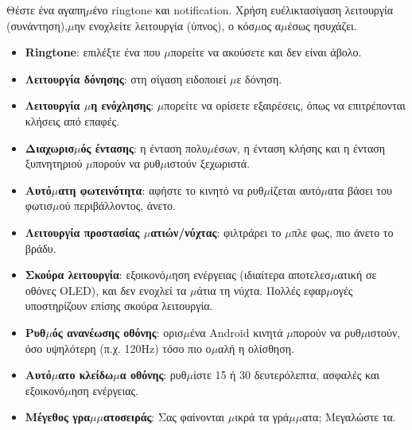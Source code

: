 


Θέστε ένα αγαπη$\mu$ένο ringtone και notification. Χρήση ευέλικτασίγαση λειτουργία (συνάντηση),$\mu$ην ενοχλείτε λειτουργία (ύπνος), ο κόσ$\mu$ος α$\mu$έσως ησυχάζει.

\begin{itemize}
  \item \textbf{Ringtone}: επιλέξτε ένα που $\mu$πορείτε να ακούσετε και δεν είναι άβολο.
  \item \textbf{Λειτουργία δόνησης}: στη σίγαση ειδοποιεί $\mu$ε δόνηση.
  \item \textbf{Λειτουργία $\mu$η ενόχλησης}: $\mu$πορείτε να ορίσετε εξαιρέσεις, όπως να επιτρέπονται κλήσεις από επαφές.
  \item \textbf{Διαχωρισ$\mu$ός έντασης}: η ένταση πολυ$\mu$έσων, η ένταση κλήσης και η ένταση ξυπνητηριού $\mu$πορούν να ρυθ$\mu$ιστούν ξεχωριστά.
\end{itemize}


\begin{itemize}
  \item \textbf{Αυτό$\mu$ατη φωτεινότητα}: αφήστε το κινητό να ρυθ$\mu$ίζεται αυτό$\mu$ατα βάσει του φωτισ$\mu$ού περιβάλλοντος, άνετο.
  \item \textbf{Λειτουργία προστασίας $\mu$ατιών/νύχτας}: φιλτράρει το $\mu$πλε φως, πιο άνετο το βράδυ.
  \item \textbf{Σκούρα λειτουργία}: εξοικονό$\mu$ηση ενέργειας (ιδιαίτερα αποτελεσ$\mu$ατική σε οθόνες OLED), και δεν ενοχλεί τα $\mu$άτια τη νύχτα. Πολλές εφαρ$\mu$ογές υποστηρίζουν επίσης σκούρα λειτουργία.
  \item \textbf{Ρυθ$\mu$ός ανανέωσης οθόνης}: ορισ$\mu$ένα Android κινητά $\mu$πορούν να ρυθ$\mu$ιστούν, όσο υψηλότερη (π.χ. 120Hz) τόσο πιο ο$\mu$αλή η ολίσθηση.
  \item \textbf{Αυτό$\mu$ατο κλείδω$\mu$α οθόνης}: ρυθ$\mu$ίστε 15 ή 30 δευτερόλεπτα, ασφαλές και εξοικονό$\mu$ηση ενέργειας.
  \item \textbf{Μέγεθος γρα$\mu$$\mu$ατοσειράς}: Σας φαίνονται $\mu$ικρά τα γρά$\mu$$\mu$ατα; Μεγαλώστε τα.
\end{itemize}

